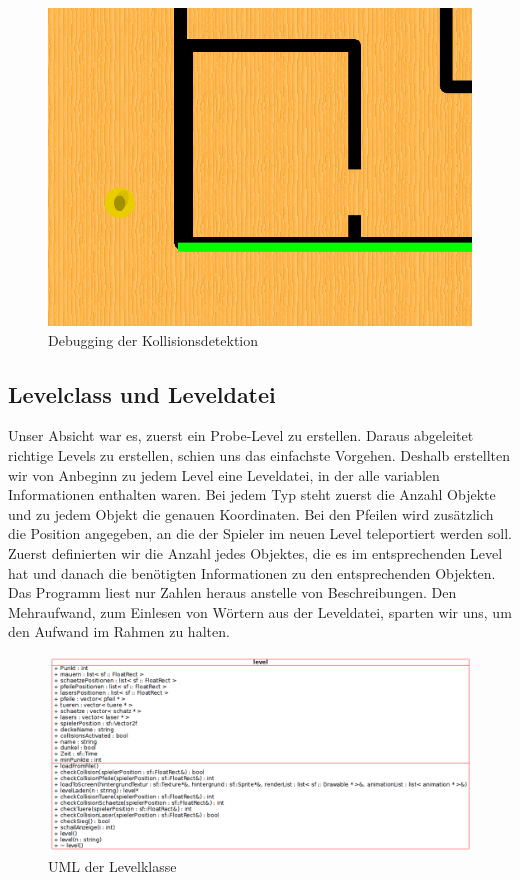 \documentclass[11pt,a4paper]{scrbook}
\begin{document}
\begin{figure}[h]
\centering
\includegraphics[scale=0.3]{img/kollisionsdetektion.png}
\caption{Debugging der Kollisionsdetektion}
\end{figure}

\subsection{Levelclass und Leveldatei}
Unser Absicht war es, zuerst ein Probe-Level zu erstellen. Daraus abgeleitet richtige Levels zu erstellen, schien uns das einfachste Vorgehen. 
Deshalb erstellten wir von Anbeginn zu jedem Level eine Leveldatei, in der alle variablen Informationen enthalten waren. 
Bei jedem Typ steht zuerst die Anzahl Objekte und zu jedem Objekt die genauen Koordinaten. 
Bei den Pfeilen wird zusätzlich die Position angegeben, an die der Spieler im neuen Level teleportiert werden soll. 
Zuerst definierten wir die Anzahl jedes Objektes, die es im entsprechenden Level hat und danach die benötigten Informationen zu den entsprechenden Objekten.
Das Programm liest nur Zahlen heraus anstelle von Beschreibungen. 
Den Mehraufwand, zum Einlesen von Wörtern aus der Leveldatei, sparten wir uns, um den Aufwand im Rahmen zu halten.

\begin{figure}[h]
\centering
\includegraphics[scale=0.45]{img/level_uml.png}
\caption{UML der Levelklasse}
\end{figure}
\end{document}
